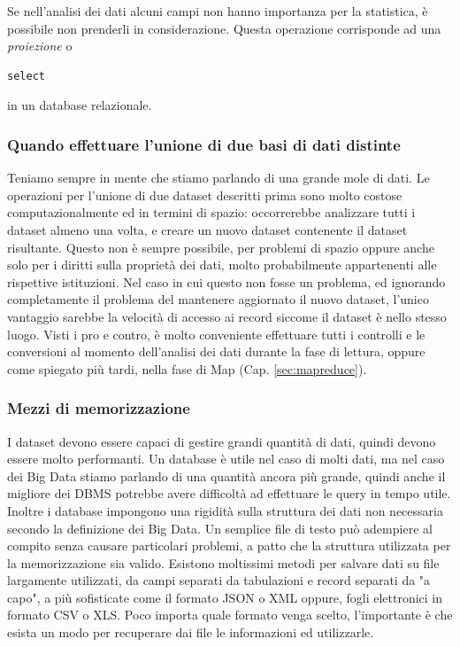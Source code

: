 \begin{itemize}
Se nell'analisi dei dati alcuni campi non hanno importanza per la statistica, è possibile non prenderli in considerazione. Questa operazione corrisponde ad una \emph{proiezione} o \begin{verbatim}select\end{verbatim} in un database relazionale.

\end{itemize}

\subsubsection{Quando effettuare l'unione di due basi di dati distinte}
Teniamo sempre in mente che stiamo parlando di una grande mole di dati. Le operazioni per l'unione di due dataset descritti prima sono molto costose computazionalmente ed in termini di spazio: occorrerebbe analizzare tutti i dataset almeno una volta, e creare un nuovo dataset contenente il dataset risultante. Questo non è sempre possibile, per problemi di spazio oppure anche solo per i diritti sulla proprietà dei dati, molto probabilmente appartenenti alle rispettive istituzioni. Nel caso in cui questo non fosse un problema, ed ignorando completamente il problema del mantenere aggiornato il nuovo dataset, l'unico vantaggio sarebbe la velocità di accesso ai record siccome il dataset è nello stesso luogo. Visti i pro e contro, è molto conveniente effettuare tutti i controlli e le conversioni al momento dell'analisi dei dati durante la fase di lettura, oppure come spiegato più tardi, nella fase di Map (Cap. \ref{sec:mapreduce}).

\subsubsection{Mezzi di memorizzazione}
I dataset devono essere capaci di gestire grandi quantità di dati, quindi devono essere molto performanti. Un database è utile nel caso di molti dati, ma nel caso dei Big Data stiamo parlando di una quantità ancora più grande, quindi anche il migliore dei DBMS potrebbe avere difficoltà ad effettuare le query in tempo utile. Inoltre i database impongono una rigidità sulla struttura dei dati non necessaria secondo la definizione dei Big Data. Un semplice file di testo può adempiere al compito senza causare particolari problemi, a patto che la struttura utilizzata per la memorizzazione sia valido. Esistono moltissimi metodi per salvare dati su file largamente utilizzati, da campi separati da tabulazioni e record separati da "a capo", a più sofisticate come il formato JSON o XML oppure, fogli elettronici in formato CSV o XLS. Poco importa quale formato venga scelto, l'importante è che esista un modo per recuperare dai file le informazioni ed utilizzarle.

